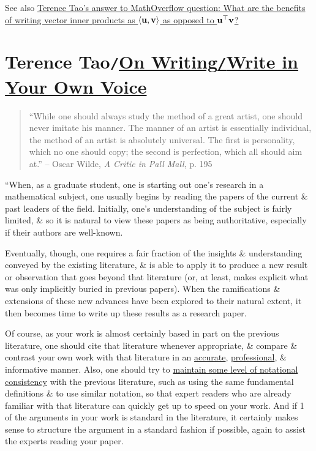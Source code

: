 \documentclass[oneside]{book}
\numberwithin{equation}{section}
\begin{document}
See also \href{https://mathoverflow.net/questions/366070/what-are-the-benefits-of-writing-vector-inner-products-as-langle-u-v-rangle/366118#366118}{Terence Tao's answer to MathOverflow question: What are the benefits of writing vector inner products as $\langle{\bf u},{\bf v}\rangle$ as opposed to ${\bf u}^\top{\bf v}$?}

\section{Terence Tao\texttt{/}\href{https://terrytao.wordpress.com/advice-on-writing-papers/write-in-your-own-voice/}{On Writing\texttt{/}Write in Your Own Voice}}

\begin{quotation}
	``While one should always study the method of a great artist, one should never imitate his manner. The manner of an artist is essentially individual, the method of an artist is absolutely universal. The first is personality, which no one should copy; the second is perfection, which all should aim at.'' -- Oscar Wilde, \textit{A Critic in Pall Mall}, p. 195
\end{quotation}
``When, as a graduate student, one is starting out one's research in a mathematical subject, one usually begins by reading the papers of the current \& past leaders of the field. Initially, one's understanding of the subject is fairly limited, \& so it is natural to view these papers as being authoritative, especially if their authors are well-known.

Eventually, though, one requires a fair fraction of the insights \& understanding conveyed by the existing literature, \& is able to apply it to produce a new result or observation that goes beyond that literature (or, at least, makes explicit what was only implicitly buried in previous papers). When the ramifications \& extensions of these new advances have been explored to their natural extent, it then becomes time to write up these results as a research paper.

Of course, as your work is almost certainly based in part on the previous literature, one should cite that literature whenever appropriate, \& compare \& contrast your own work with that literature in an \href{https://terrytao.wordpress.com/advice-on-writing-papers/describe-the-results-accurately/}{accurate}, \href{https://terrytao.wordpress.com/advice-on-writing-papers/write-professionally/}{professional}, \& informative manner. Also, one should try to \href{https://terrytao.wordpress.com/advice-on-writing-papers/use-good-notation/}{maintain some level of notational consistency} with the previous literature, such as using the same fundamental definitions \& to use similar notation, so that expert readers who are already familiar with that literature can quickly get up to speed on your work. And if 1 of the arguments in your work is standard in the literature, it certainly makes sense to structure the argument in a standard fashion if possible, again to assist the experts reading your paper.
\end{document}
